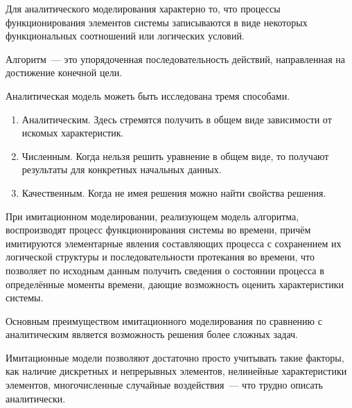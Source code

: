 Для аналитического моделирования характерно то, что процессы функционирования элементов системы записываются в виде некоторых функциональных соотношений или логических условий.

\begin{dd}
    Алгоритм~--- это упорядоченная последовательность действий, направленная на достижение конечной цели.
\end{dd}

Аналитическая модель можеть быть исследована тремя способами.

\begin{enumerate}
    \item Аналитическим. Здесь стремятся получить в общем виде зависимости от искомых характеристик.
    \item Численным. Когда нельзя решить уравнение в общем виде, то получают результаты для конкретных начальных данных.
    \item Качественным. Когда не имея решения можно найти свойства решения.
\end{enumerate}

При имитационном моделировании, реализующем модель алгоритма, воспроизводят процесс функционирования системы во времени, причём имитируются элементарные явления составляющих процесса с сохранением их логической структуры и последовательности протекания во времени, что позволяет по исходным данным получить сведения о состоянии процесса в определённые моменты времени, дающие возможность оценить характеристики системы.

Основным преимуществом имитационного моделирования по сравнению с аналитическим является возможность решения более сложных задач.

Имитационные модели позволяют достаточно просто учитывать такие факторы, как наличие дискретных и непрерывных элементов, нелинейные характеристики элементов, многочисленные случайные воздействия~--- что трудно описать аналитически.